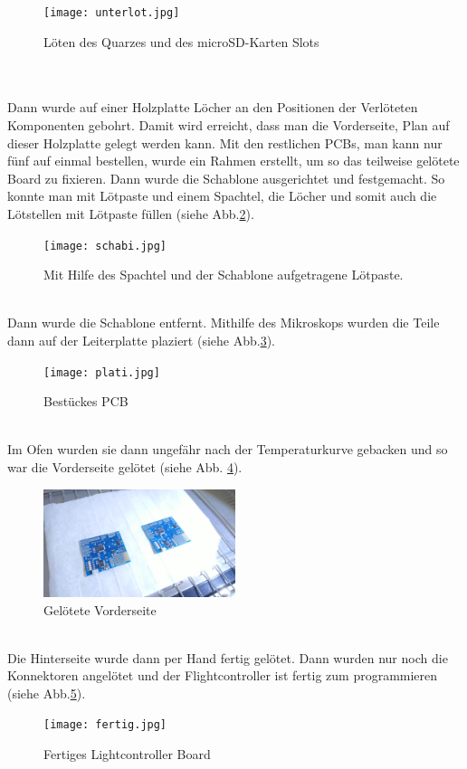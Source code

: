 \documentclass[12pt,a4paper, ngerman]{article}
\begin{document}
\begin{figure}[h]
\centering
\texttt{[image: unterlot.jpg]}
\caption[Eigenes Bild]{Löten des Quarzes und des microSD-Karten Slots}\label{unterlot}
\end{figure} \\ \\
Dann wurde auf einer Holzplatte Löcher an den Positionen der Verlöteten Komponenten gebohrt. Damit wird erreicht, dass man die Vorderseite, Plan auf dieser Holzplatte gelegt werden kann. Mit den restlichen PCBs, man kann nur fünf auf einmal bestellen, wurde ein Rahmen erstellt, um so das teilweise gelötete Board zu fixieren. Dann wurde die Schablone ausgerichtet und festgemacht. So konnte man mit Lötpaste und einem Spachtel, die Löcher und somit auch die Lötstellen mit Lötpaste füllen (siehe Abb.\ref{schabi}). 
\begin{figure}[h]
\centering
\texttt{[image: schabi.jpg]}
\caption[Eigenes Bild]{Mit Hilfe des Spachtel und der Schablone aufgetragene Lötpaste.}\label{schabi}
\end{figure} \\
Dann wurde die Schablone entfernt. Mithilfe des Mikroskops wurden die Teile dann auf der Leiterplatte plaziert (siehe Abb.\ref{plati}). 
\begin{figure}[h]
\centering
\texttt{[image: plati.jpg]}
\caption[Eigenes Bild]{Bestückes PCB}\label{plati}
\end{figure} \\
Im Ofen wurden sie dann ungefähr nach der Temperaturkurve gebacken und so war die Vorderseite gelötet (siehe Abb. \ref{vordi}). \\
\begin{figure}[h!]
\centering
\includegraphics[width=0.5\textwidth]{vordi.jpg}
\caption[Eigenes Bild]{Gelötete Vorderseite}\label{vordi}
\end{figure} \\ 
Die Hinterseite wurde dann per Hand fertig gelötet. Dann wurden nur noch die Konnektoren angelötet und der Flightcontroller ist fertig zum programmieren (siehe Abb.\ref{fertig}).
\begin{figure}[h!]
\centering
\texttt{[image: fertig.jpg]}
\caption[Eigenes Bild]{Fertiges Lightcontroller Board}\label{fertig}
\end{figure} \\
\newpage
\end{document}
